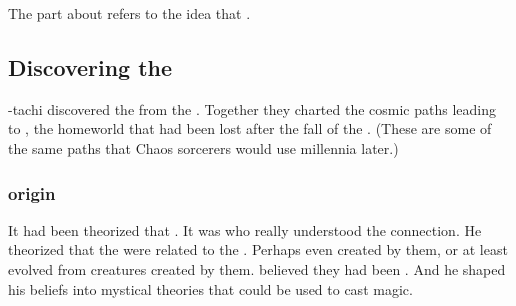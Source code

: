 The part about  refers to the idea that . 









\subsection{Discovering the \xss}
\Sethicus-tachi discovered the \xss{} from the . 
Together they charted the cosmic paths leading to \Machai, the \xzaishannic{} homeworld that had been lost after the fall of the \ophidians. 
(These are some of the same paths that Chaos sorcerers would use millennia later.)





\subsubsection{\Ophidian origin}
It had been theorized that . 
It was \Sethicus who really understood the connection. 
He theorized that the \ophidians were related to the \xss.
Perhaps even created by them, or at least evolved from creatures created by them.
\Sethicus believed they had been . 
And he shaped his beliefs into mystical theories that could be used to cast magic. 

